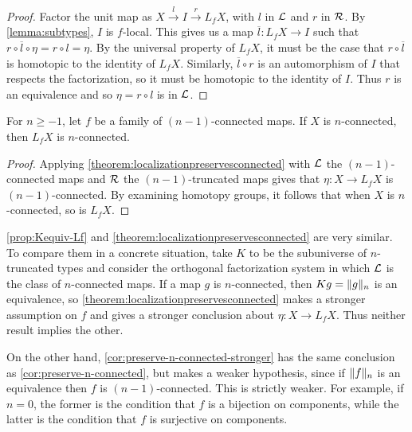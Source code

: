 
\begin{proof}
    Factor the unit map as $X \xrightarrow{l} I \xrightarrow{r} L_f X$, with $l$ in $\LLL$
    and $r$ in $\RRR$.
    By \cref{lemma:subtypes},
    $I$ is $f$-local. This gives us a map $\overline{l} : L_f X \to I$
    such that $r \circ \overline{l} \circ \eta = r \circ l = \eta$.
    By the universal property of $L_f X$, it must be the case that $r \circ \overline{l}$
    is homotopic to the identity of $L_f X$.
    Similarly, $\overline{l} \circ r$ is an automorphism of $I$ that respects the
    factorization, so it must be homotopic to the identity of $I$.
    Thus $r$ is an equivalence and so $\eta = r \circ l$ is in $\LLL$.
\end{proof}

\begin{cor}\label{cor:preserve-n-connected-stronger}
    For $n \geq -1$, let $f$ be a family of $(n-1)$-connected maps.
    If $X$ is $n$-connected, then $L_f X$ is $n$-connected.
\end{cor}

\begin{proof}
    Applying \cref{theorem:localizationpreservesconnected} with
    $\LLL$ the $(n-1)$-connected maps and $\RRR$ the $(n-1)$-truncated maps
    gives that $\eta : X \to L_f X$ is $(n-1)$-connected.
    By examining homotopy groups, it follows that when $X$ is $n$-connected,
    so is $L_f X$.
\end{proof}

\cref{prop:Kequiv-Lf} and \cref{theorem:localizationpreservesconnected} are very similar.
To compare them in a concrete situation, take $K$ to be the subuniverse of $n$-truncated
types and consider the orthogonal factorization system in which $\LLL$ is the
class of $n$-connected maps.
If a map $g$ is $n$-connected, then $Kg = \trunc{n}{g}$ is an equivalence, so
\cref{theorem:localizationpreservesconnected} makes a stronger assumption on $f$
and gives a stronger conclusion about $\eta : X \to L_f X$.
Thus neither result implies the other.

On the other hand, \cref{cor:preserve-n-connected-stronger} has the same
conclusion as \cref{cor:preserve-n-connected}, but makes a weaker hypothesis,
since if $\trunc{n}{f}$ is an equivalence then $f$ is $(n-1)$-connected.
This is strictly weaker.  For example, if $n = 0$, the former is the
condition that $f$ is a bijection on components, while the latter is
the condition that $f$ is surjective on components.

